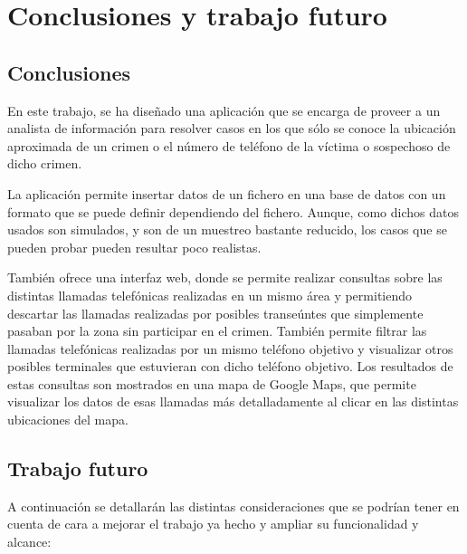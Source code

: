 \chapter{Conclusiones y trabajo futuro\label{CAP:CONCTRAB}}
  \section{Conclusiones\label{SEC:CONCLUSIONES}}
    En este trabajo, se ha diseñado una aplicación que se encarga de proveer a un analista de información para resolver casos en los que sólo se conoce la ubicación aproximada de un crimen o el número de teléfono de la víctima o sospechoso de dicho crimen.
    
    La aplicación permite insertar datos de un fichero en una base de datos con un formato que se puede definir dependiendo del fichero. Aunque, como dichos datos usados son simulados, y son de un muestreo bastante reducido, los casos que se pueden probar pueden resultar poco realistas.
    
    También ofrece una interfaz web, donde se permite realizar consultas sobre las distintas llamadas telefónicas realizadas en un mismo área y permitiendo descartar las llamadas realizadas por posibles transeúntes que simplemente pasaban por la zona sin participar en el crimen.
    También permite filtrar las llamadas telefónicas realizadas por un mismo teléfono objetivo y visualizar otros posibles terminales que estuvieran con dicho teléfono objetivo.
    Los resultados de estas consultas son mostrados en una mapa de Google Maps, que permite visualizar los datos de esas llamadas más detalladamente al clicar en las distintas ubicaciones del mapa.
    
  \section{Trabajo futuro\label{SEC:TRABAJO}}
    A continuación se detallarán las distintas consideraciones que se podrían tener en cuenta de cara a mejorar el trabajo ya hecho y ampliar su funcionalidad y alcance:
    
